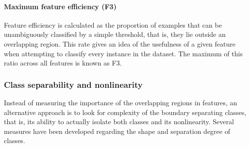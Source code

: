 \paragraph*{Maximum feature efficiency (F3)} Feature efficiency is calculated as the proportion of examples that can be unambiguously classified by a simple threshold, that is, they lie outside an overlapping region. This rate gives an idea of the usefulness of a given feature when attempting to classify every instance in the dataset. The maximum of this ratio across all features is known as F3.

\subsubsection{Class separability and nonlinearity}

Instead of measuring the importance of the overlapping regions in features, an alternative approach is to look for complexity of the boundary separating classes, that is, its ability to actually isolate both classes and its nonlinearity. Several measures have been developed regarding the shape and separation degree of classes.



